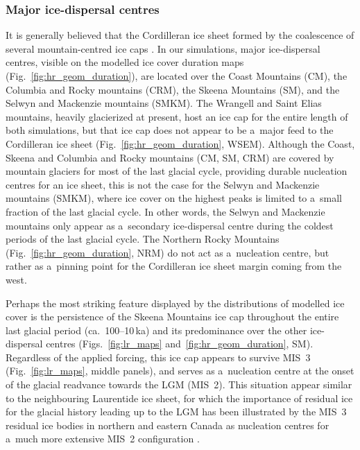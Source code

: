 \documentclass[tc, manuscript]{copernicus}
\begin{document}
\subsubsection{Major ice-dispersal centres}

      It is generally believed that the Cordilleran ice sheet formed by the
      coalescence of several mountain-centred ice caps
      \citep{Davis.Mathews.1944}. In our simulations, major ice-dispersal
      centres, visible on the modelled ice cover duration maps
      (Fig.~\ref{fig:hr_geom_duration}), are located over the Coast
      Mountains (CM), the Columbia and Rocky mountains (CRM), the Skeena
      Mountains (SM), and the Selwyn and Mackenzie mountains (SMKM). The
      Wrangell and Saint Elias mountains, heavily glacierized at present,
      host an ice cap for the entire length of both simulations, but that
      ice cap does not appear to be a~major feed to the Cordilleran ice
      sheet (Fig.~\ref{fig:hr_geom_duration}, WSEM). Although the Coast,
      Skeena and Columbia and Rocky mountains (CM, SM, CRM) are covered by
      mountain glaciers for most of the last glacial cycle, providing
      durable nucleation centres for an ice sheet, this is not the case for
      the Selwyn and Mackenzie mountains (SMKM), where ice cover on the
      highest peaks is limited to a~small fraction of the last glacial
      cycle. In other words, the Selwyn and Mackenzie mountains only appear
      as a~secondary ice-dispersal centre during the coldest periods of the
      last glacial cycle. The Northern Rocky Mountains
      (Fig.~\ref{fig:hr_geom_duration}, NRM) do not act as a~nucleation
      centre, but rather as a~pinning point for the Cordilleran ice sheet
      margin coming from the west.

      Perhaps the most striking feature displayed by the distributions of
      modelled ice cover is the persistence of the Skeena Mountains ice cap
      throughout the entire last glacial period (ca.~100--10\,\unit{ka}) and
      its predominance over the other ice-dispersal centres
      (Figs.~\ref{fig:lr_maps} and~\ref{fig:hr_geom_duration}, SM).
      Regardless of the applied forcing, this ice cap appears to survive
      MIS~3 (Fig.~\ref{fig:lr_maps}, middle panels), and serves as
      a~nucleation centre at the onset of the glacial readvance towards the
      LGM (MIS~2). This situation appear similar to the neighbouring
      Laurentide ice sheet, for which the importance of residual ice for the
      glacial history leading up to the LGM has been illustrated by the
      MIS~3 residual ice bodies in northern and eastern Canada as nucleation
      centres for a~much more extensive MIS~2 configuration
      \citep{Kleman.etal.2010}.
\end{document}
